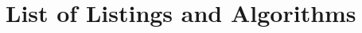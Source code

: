 \listoffigures

\listoftables

\chapter{List of Listings and Algorithms}
	
\let\LaTeXStandardClearpage\clearpage
\let\clearpage\relax  %
\renewcommand{\listalgorithmcfname}{Algorithms}

\lstlistoflistings

\begingroup


    \renewcommand{\figurename}{Algorithm}
\endgroup

\let\clearpage\LaTeXStandardClearpage %
